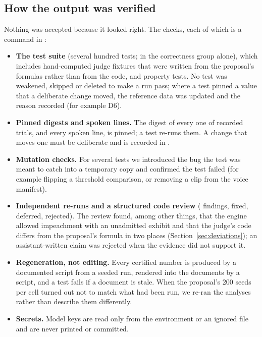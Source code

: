 \subsection{How the output was verified}
Nothing was accepted because it looked right. The checks, each of which is a command in :
\begin{itemize}
\item \textbf{The test suite} (several hundred tests; \TestsCorrectness{} in the correctness group alone), which includes hand-computed judge fixtures that were written from the proposal's formulas rather than from the code, and property tests. No test was weakened, skipped or deleted to make a run pass; where a test pinned a value that a deliberate change moved, the reference data was updated and the reason recorded (for example D6).
\item \textbf{Pinned digests and spoken lines.} The digest of every one of \ReplayTotal{} recorded trials, and every spoken line, is pinned; a test re-runs them. A change that moves one must be deliberate and is recorded in .
\item \textbf{Mutation checks.} For several tests we introduced the bug the test was meant to catch into a temporary copy and confirmed the test failed (for example flipping a threshold comparison, or removing a clip from the voice manifest).
\item \textbf{Independent re-runs and a structured code review} (\ReviewTotal{} findings, \ReviewFixed{} fixed, \ReviewDeferred{} deferred, \ReviewRejected{} rejected). The review found, among other things, that the engine allowed impeachment with an unadmitted exhibit and that the judge's code differs from the proposal's formula in two places (Section~\ref{sec:deviations}); an assistant-written claim was rejected when the evidence did not support it.
\item \textbf{Regeneration, not editing.} Every certified number is produced by a documented script from a seeded run, rendered into the documents by a script, and a test fails if a document is stale. When the proposal's 200 seeds per cell turned out not to match what had been run, we re-ran the analyses rather than describe them differently.
\item \textbf{Secrets.} Model keys are read only from the environment or an ignored  file and are never printed or committed.
\end{itemize}

